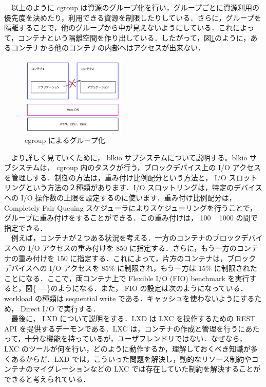\documentclass[graduation-thesis]{jsarticle}
\begin{document}
　以上のように cgroup は資源のグループ化を行い，グループごとに資源利用の優先度を決めたり，利用できる資源を制限したりしている．さらに，グループを隔離することで，他のグループから中が見えないようにしている．これによって，コンテナという隔離空間を作り出している．したがって，図\ref{fig:grouping}のように，あるコンテナから他のコンテナの内部へはアクセスが出来ない．\\
\begin{figure}[H]
	\begin{center}
		\includegraphics[width=5.0cm, clip]{images/kakuri.pdf}
		\caption{cgroup によるグループ化}
		\label{fig:grouping}
	\end{center}
\end{figure}
　より詳しく見ていくために， blkio サブシステムについて説明する。blkio サブシステムは， cgroup 内のタスクが行う，ブロックデバイス上の I/O アクセスを管理しする．制御の方法は，重み付け比例配分という方法と， I/O スロットリングという方法の２種類があります．I/O スロットリングは，特定のデバイスへの I/O 操作数の上限を設定するのに使います．重み付け比例配分は， Completely Fair Queuing スケジューラによりスケジューリングを行うことで，グループに重み付けをすることができる．この重み付けは， 100 ~ 1000 の間で指定できる．\\
　例えば，コンテナが２つある状況を考える．一方のコンテナのブロックデバイスへの I/O アクセスの重み付けを 850 に指定する．さらに，もう一方のコンテナの重み付けを 150 に指定する．これによって，片方のコンテナは，ブロックデバイスへの I/O アクセスを 85\% に制限され，もう一方は 15\% に制限されたことになる．ここで，両コンテナ上で Flexible I/O (FIO) benchmark を実行すると，図\{-----\}のようになる．また， FIO の設定は次のようになっている．workload の種類は sequential write である．キャッシュを使わないようにするため， Direct I/O で実行する．\\
　最後に， LXD について説明をする．LXD は LXC を操作するための REST API を提供するデーモンである．LXC は，コンテナの作成と管理を行うにあたって，十分な機能を持っているが，ユーザフレンドリではない．なぜなら， LXC のツールが何を行い，どのように動作するか，理解しておくべき知識が多くあるからだ．LXD では，こういった問題を解決し，動的なリソース制約やコンテナのマイグレーションなどの LXC では存在していた制約を解決することができると考えられている．
　
\clearpage
\end{document}
